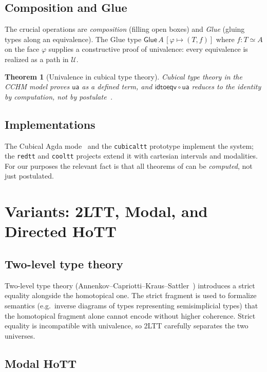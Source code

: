 \documentclass[12pt]{article}
\newtheorem{theorem}{Theorem}[section]
\theoremstyle{definition}
\theoremstyle{remark}
\newcommand{\U}{\mathcal{U}}
\newcommand{\ua}{\mathsf{ua}}
\newcommand{\idtoeqv}{\mathsf{idtoeqv}}
\newcommand{\eqv}{\simeq}
\begin{document}
\subsection{Composition and Glue}

The crucial operations are \emph{composition} (filling open boxes) and
\emph{Glue} (gluing types along an equivalence). The Glue type
$\mathsf{Glue}\,A\,[\varphi \mapsto (T, f)]$ where $f : T \eqv A$ on the
face $\varphi$ supplies a constructive proof of univalence: every
equivalence is realized as a path in $\U$.

\begin{theorem}[Univalence in cubical type theory]
\label{thm:cubical-univalence}
Cubical type theory in the CCHM model proves $\ua$ as a defined term, and
$\idtoeqv \circ \ua$ reduces to the identity by computation, not by
postulate~\cite{CCHM, CubicalAgda}.
\end{theorem}

\subsection{Implementations}

The Cubical Agda mode~\cite{CubicalAgda} and the
\texttt{cubicaltt} prototype implement the system; the \texttt{redtt} and
\texttt{cooltt} projects extend it with cartesian intervals and modalities.
For our purposes the relevant fact is that all theorems of
 can be \emph{computed}, not just postulated.

\section{Variants: 2LTT, Modal, and Directed HoTT}
\label{sec:variants}

\subsection{Two-level type theory}

Two-level type theory (Annenkov--Capriotti--Kraus--Sattler~\cite{2LTT})
introduces a strict equality alongside the homotopical one. The strict
fragment is used to formalize semantics (e.g.\ inverse diagrams of types
representing semisimplicial types) that the homotopical fragment alone
cannot encode without higher coherence. Strict equality is incompatible
with univalence, so 2LTT carefully separates the two universes.

\subsection{Modal HoTT}
\end{document}

